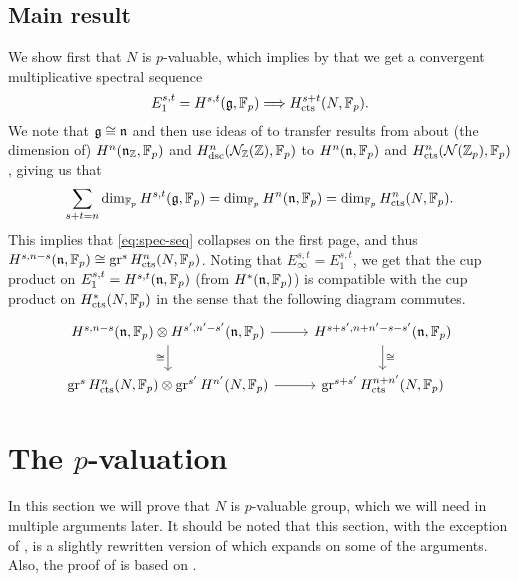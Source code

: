 \subsection{Main result}%
\label{subsec:main-res}

We show first that $N$ is $p$-valuable, which implies by \cite[§6.1]{Sor} that we get a convergent multiplicative spectral sequence
\begin{equation}
  \label{eq:spec-seq}
  E_1^{s,t} = H^{s,t}(\mathfrak{g},\mathbb{F}_p) \Longrightarrow H_{\mathrm{cts}}^{s+t}(N,\mathbb{F}_p).
\end{equation}
We note that $\mathfrak{g} \cong \mathfrak{n}$ and then use ideas of \cite[§7]{GK} to transfer results from \cite{PT} about (the dimension of) $H^n(\mathfrak{n}_{\mathbb{Z}},\mathbb{F}_p)$ and $H_{\mathrm{dsc}}^n(\mathcal{N}_{\mathbb{Z}}(\mathbb{Z}),\mathbb{F}_p)$ to $H^n(\mathfrak{n},\mathbb{F}_p)$ and $H_{\mathrm{cts}}^n(\mathcal{N}(\mathbb{Z}_p),\mathbb{F}_p)$, giving us that \[\sum_{s+t=n} \dim_{\mathbb{F}_p} H^{s,t}(\mathfrak{g},\mathbb{F}_p) = \dim_{\mathbb{F}_p} H^n(\mathfrak{n},\mathbb{F}_p) = \dim_{\mathbb{F}_p} H_{\mathrm{cts}}^n(N,\mathbb{F}_p).\] This implies that \eqref{eq:spec-seq} collapses on the first page, and thus $H^{s,n-s}(\mathfrak{n},\mathbb{F}_p) \cong \operatorname{gr}^s H_{\mathrm{cts}}^n(N,\mathbb{F}_p)$. Noting that $E_\infty^{s,t} = E_1^{s,t}$, we get that the cup product on $E_1^{s,t} = H^{s,t}(\mathfrak{n},\mathbb{F}_p)$ (from $H^*(\mathfrak{n},\mathbb{F}_p)$) is compatible with the cup product on $H_{\mathrm{cts}}^*(N,\mathbb{F}_p)$ in the sense that the following diagram commutes.
\[
  \begin{tikzcd}
    H^{s,n-s}(\lie{n},\F_p) \otimes H^{s',n'-s'}(\lie{n},\F_p) \ar[r] \ar[d,swap,"\iso"] & H^{s+s',n+n'-s-s'}(\lie{n},\F_p) \ar[d,"\iso"] \\
    \gr^s \Hc^n(N,\F_p) \otimes \gr^{s'} H^{n'}(N,\F_p) \ar[r] & \gr^{s+s'}\Hc^{n+n'}(N,\F_p)
  \end{tikzcd}
\]

\section{The \texorpdfstring{$p$}{p}-valuation}\label{sec:pval}

In this section we will prove that $N$ is $p$-valuable group, which we will need in multiple arguments later. It should be noted that this section, with the exception of , is a slightly rewritten version of \cite{Sch-notes} which expands on some of the arguments. Also, the proof of  is based on \cite[Lem.~1]{Zab}.

